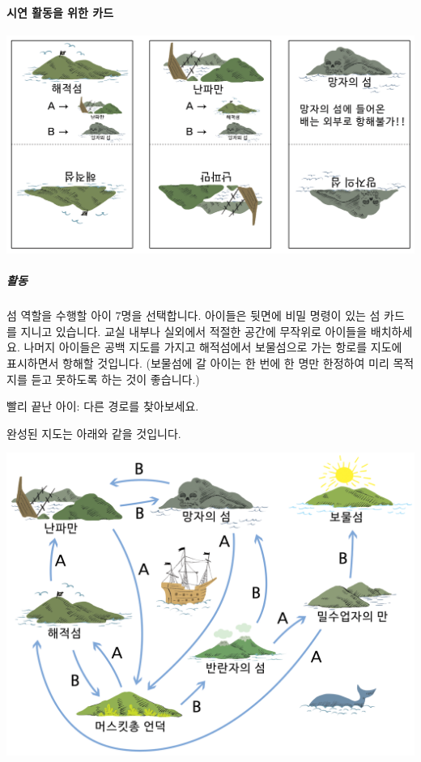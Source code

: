 \documentclass[]{article}
\begin{document}
\mbox{}\paragraph{시연 활동을 위한 카드}\label{section-162}

\includegraphics{csunplugged/03-part/img/ch12-fsm/11-fsm-01-three-islands-cards.png}

\subparagraph{활동}\label{section-163}

섬 역할을 수행할 아이 7명을 선택합니다. 아이들은 뒷면에 비밀 명령이 있는
섬 카드를 지니고 있습니다. 교실 내부나 실외에서 적절한 공간에 무작위로
아이들을 배치하세요. 나머지 아이들은 공백 지도를 가지고 해적섬에서
보물섬으로 가는 항로를 지도에 표시하면서 항해할 것입니다. (보물섬에 갈
아이는 한 번에 한 명만 한정하여 미리 목적지를 듣고 못하도록 하는 것이
좋습니다.)

빨리 끝난 아이: 다른 경로를 찾아보세요.

완성된 지도는 아래와 같을 것입니다.

\includegraphics{csunplugged/03-part/img/ch12-fsm/11-fsm-02-treasury-map.png}
\end{document}
